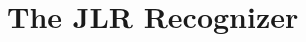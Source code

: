 \documentclass[a4paper,USenglish]{lipics}
\author{Joseph (Yossi) Gil \& Tomer Levy
}
\begin{document}
\section{The JLR Recognizer}

\end{document}
